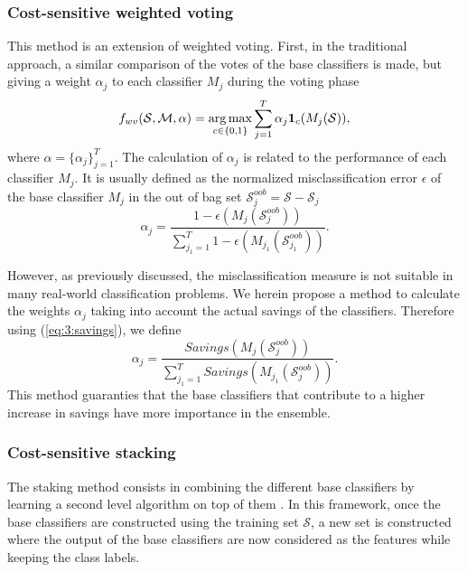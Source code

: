 {\subsubsection{Cost-sensitive weighted voting}

This method is an extension of weighted voting. First, in the traditional approach, a 
similar comparison of the votes of the base classifiers is made, but giving a weight $\alpha_j$ 
to each classifier $M_j$ during the voting phase \citep{Zhou2012}
\begin{align} \label{eq:9:weighted-majority-vote}
  f_{wv}(\mathcal{S},\mathcal{M}, \alpha)
  =\operatorname*{arg\,max}_{c \in \{0,1\}} \sum_{j=1}^T \alpha_j \mathbf{1}_c(M_j(\mathcal{S})),
\end{align}
where $\alpha=\{\alpha_j\}_{j=1}^T$.
The calculation of $\alpha_j$ is related to the performance of each classifier $M_j$.
It is usually defined as the normalized misclassification error   $\epsilon$ of the base 
classifier $M_j$  in the out of bag set   $\mathcal{S}_j^{oob}=\mathcal{S}-\mathcal{S}_j$
\begin{equation}
  \alpha_j=\frac{1-\epsilon(M_j(\mathcal{S}_j^{oob}))}{\sum_{j_1=1}^T 
  1-\epsilon(M_{j_1}(\mathcal{S}_{j_1}^{oob}))}.
\end{equation}

\noindent However, as previously discussed, the misclassification measure is not suitable in  many 
real-world classification problems. We  herein propose a method to calculate the weights $\alpha_j$ 
 taking into account the actual savings of the classifiers. Therefore using (\ref{eq:3:savings}), we 
define
\begin{equation}
  \alpha_j=\frac{Savings(M_j(\mathcal{S}_j^{oob}))}
  {\sum_{j_1=1}^T Savings(M_{j_1}(\mathcal{S}_j^{oob}))}.
\end{equation}
This method guaranties that the base classifiers that contribute to a higher increase in savings 
have more importance in the ensemble.

\subsubsection{Cost-sensitive stacking}
\label{sec:9:staking}

The staking method consists in combining the different base classifiers by learning a 
second level algorithm on top of them \citep{Wolpert1992}. In this framework, once the base 
classifiers are constructed using the training set  $\mathcal{S}$, a new set is constructed 
where the output of the base classifiers  are now considered as the features while keeping the 
class labels.

}
